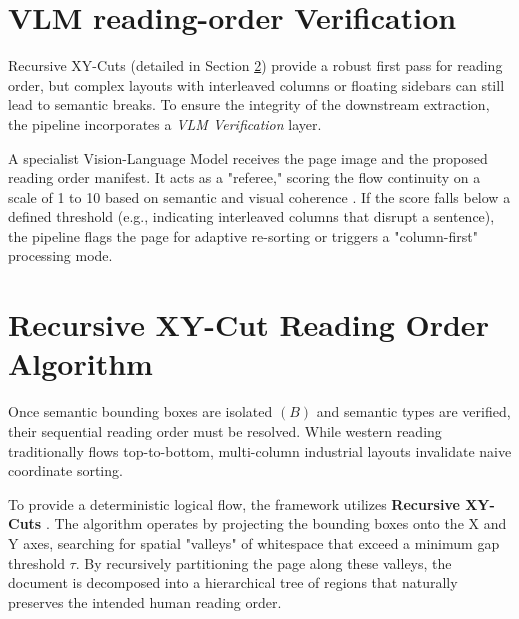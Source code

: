\section{VLM reading-order Verification}
\label{sec:vlm_verification}

Recursive XY-Cuts (detailed in Section \ref{sec:xy_cuts}) provide a robust first pass for reading order, but complex layouts with interleaved columns or floating sidebars can still lead to semantic breaks. To ensure the integrity of the downstream extraction, the pipeline incorporates a \textit{VLM Verification} layer.

A specialist Vision-Language Model \citep{qwen25} receives the page image and the proposed reading order manifest. It acts as a "referee," scoring the flow continuity on a scale of 1 to 10 based on semantic and visual coherence \citep{chain_of_thought}. If the score falls below a defined threshold (e.g., indicating interleaved columns that disrupt a sentence), the pipeline flags the page for adaptive re-sorting or triggers a "column-first" processing mode. 

\section{Recursive XY-Cut Reading Order Algorithm}
\label{sec:xy_cuts}

Once semantic bounding boxes are isolated $(B)$ and semantic types are verified, their sequential reading order must be resolved. While western reading traditionally flows top-to-bottom, multi-column industrial layouts invalidate naive coordinate sorting.

To provide a deterministic logical flow, the framework utilizes \textbf{Recursive XY-Cuts} \citep{xycut_ogorman}. The algorithm operates by projecting the bounding boxes onto the X and Y axes, searching for spatial "valleys" of whitespace that exceed a minimum gap threshold $\tau$. By recursively partitioning the page along these valleys, the document is decomposed into a hierarchical tree of regions that naturally preserves the intended human reading order. 
